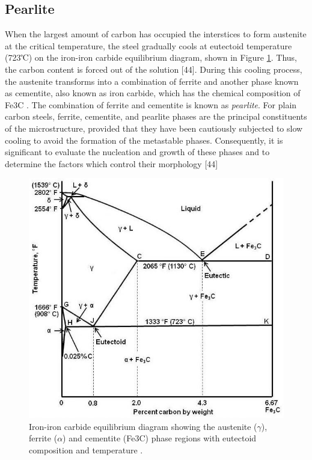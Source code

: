 \documentclass[12pt]{report}
\begin{document}
\subsection{Pearlite} 
When the largest amount of carbon has occupied the interstices to form austenite at the critical temperature, the steel gradually cools at eutectoid temperature (723℃) on the iron-iron carbide equilibrium diagram, shown in Figure \ref{ch3:figure:equilibrium}. Thus, the carbon content is forced out of the solution [44]. During this cooling process, the austenite transforms into a combination of ferrite and another phase known as cementite, also known as iron carbide, which has the chemical composition of Fe3C \cite{cmrp2014maintenance}. The combination of ferrite and cementite is known as \emph{pearlite}.  
For plain carbon steels, ferrite, cementite, and pearlite phases are the principal constituents of the microstructure, provided that they have been cautiously subjected to slow cooling to avoid the formation of the metastable phases. Consequently, it is significant to evaluate the nucleation and growth of these phases and to determine the factors which control their morphology [44]

\begin{figure}[H]
    \centering
    \includegraphics[width=\textwidth]{iron-iron_carbide_equilibrium_diagram.jpg}
    \caption{Iron-iron carbide equilibrium diagram showing the austenite ($\gamma$), ferrite ($\alpha$) and cementite (Fe3C) phase regions with eutectoid composition and temperature \cite{cmrp2014maintenance}.}
    \label{ch3:figure:equilibrium}
\end{figure}
\end{document}
